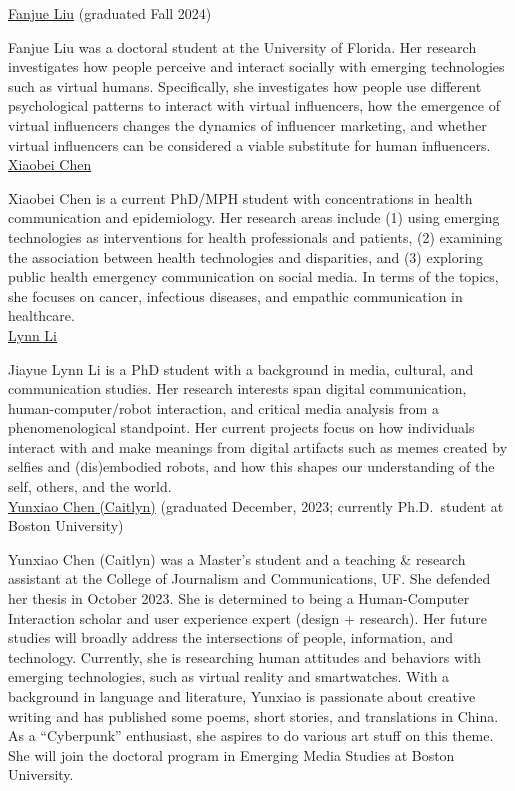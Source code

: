 \documentclass[]{article}
\begin{document}
\href{https://www.fanjueliu.com/}{Fanjue Liu} (graduated Fall 2024)

Fanjue Liu was a doctoral student at the University of Florida. Her
research investigates how people perceive and interact socially with
emerging technologies such as virtual humans. Specifically, she
investigates how people use different psychological patterns to interact
with virtual influencers, how the emergence of virtual influencers
changes the dynamics of influencer marketing, and whether virtual
influencers can be considered a viable substitute for human
influencers.\\

\href{https://www.linkedin.com/in/xiaobei-chen/}{Xiaobei Chen}

Xiaobei Chen is a current PhD/MPH student with concentrations in health
communication and epidemiology. Her research areas include (1) using
emerging technologies as interventions for health professionals and
patients, (2) examining the association between health technologies and
disparities, and (3) exploring public health emergency communication on
social media. In terms of the topics, she focuses on cancer, infectious
diseases, and empathic communication in healthcare.\\

 \href{https://www.jou.ufl.edu/staff/jiayue-lynn-li/}{Lynn Li}

Jiayue Lynn Li is a PhD student with a background in media, cultural,
and communication studies. Her research interests span digital
communication, human-computer/robot interaction, and critical media
analysis from a phenomenological standpoint. Her current projects focus
on how individuals interact with and make meanings from digital
artifacts such as memes created by selfies and (dis)embodied robots, and
how this shapes our understanding of the self, others, and the world.\\

\href{https://www.linkedin.com/in/yunxiao-caitlyn-chen-133413178/}{Yunxiao
Chen (Caitlyn)} (graduated December, 2023; currently Ph.D.~student at
Boston University)

Yunxiao Chen (Caitlyn) was a Master's student and a teaching \& research
assistant at the College of Journalism and Communications, UF. She
defended her thesis in October 2023. She is determined to being a
Human-Computer Interaction scholar and user experience expert (design +
research). Her future studies will broadly address the intersections of
people, information, and technology. Currently, she is researching human
attitudes and behaviors with emerging technologies, such as virtual
reality and smartwatches. With a background in language and literature,
Yunxiao is passionate about creative writing and has published some
poems, short stories, and translations in China. As a ``Cyberpunk''
enthusiast, she aspires to do various art stuff on this theme. She will
join the doctoral program in Emerging Media Studies at Boston
University.\\
\end{document}
